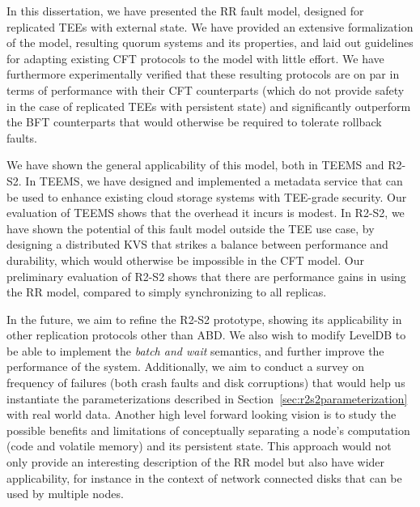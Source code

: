 \label{chap:conclusion}
\cleardoublepage{}

In this dissertation, we have presented the \acf{RR} fault model,
designed for replicated \acp{TEE} with external state. We have
provided an extensive formalization of the model, resulting
quorum systems and its properties, and laid out guidelines for
adapting existing \ac{CFT} protocols to the model with little
effort. We have furthermore experimentally verified that these
resulting protocols are on par in terms of performance with their
\ac{CFT} counterparts (which do not provide safety in the case of
replicated \acp{TEE} with persistent state) and significantly
outperform the \ac{BFT} counterparts that would otherwise be
required to tolerate rollback faults.

We have shown the general applicability of this model, both in
\ac{TEEMS} and \ac{R2-S2}. In \ac{TEEMS}, we have designed and
implemented a metadata service that can be used to enhance
existing cloud storage systems with \ac{TEE}-grade security. Our
evaluation of \ac{TEEMS} shows that the overhead it incurs is
modest. In \ac{R2-S2}, we have shown the potential of this fault
model outside the \ac{TEE} use case, by designing a distributed
\ac{KVS} that strikes a balance between performance and
durability, which would otherwise be impossible in the \ac{CFT} model. Our
preliminary evaluation of \ac{R2-S2} shows that there are
performance gains in using the \ac{RR} model, compared to simply
synchronizing to all replicas.

In the future, we aim to refine the \ac{R2-S2} prototype, showing
its applicability in other replication protocols other than
\ac{ABD}. We also wish to modify LevelDB to be able to
implement the \emph{batch and wait} semantics, and further
improve the performance of the system. Additionally, we aim to
conduct a survey on frequency of failures (both crash faults and
disk corruptions) that would help us instantiate the
parameterizations described in
Section~\ref{sec:r2s2parameterization} with real world data.
Another high level forward looking vision is to study the
possible benefits and limitations of conceptually separating a
node's computation (code and volatile memory) and its persistent
state. This approach would not only provide an interesting
description of the \ac{RR} model but also have wider
applicability, for instance in the context of network connected
disks that can be used by multiple nodes.

